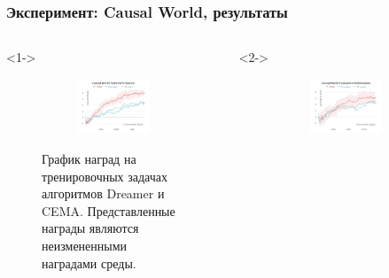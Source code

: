 \begin{frame}
\frametitle{Эксперимент: Causal World, результаты}

\begin{columns}[t]
\begin{column}{0.48\linewidth}<1->
    \begin{figure}
        \begin{subfigure}{\linewidth}
        \centering
          \includegraphics[height=0.5\paperheight]{images/performance/cema_res_cw.png}
        \end{subfigure}
      \caption{График наград на тренировочных задачах алгоритмов Dreamer и CEMA. Представленные награды являются неизмененными наградами среды.}
    \end{figure}
\end{column}
\hfill
\begin{column}{0.48\linewidth}<2->
    \begin{figure}
        \begin{subfigure}{\linewidth}
          \centering
          \includegraphics[height=0.5\paperheight]{images/performance/cema_eval_cw.png}

\end{subfigure}
\end{figure}
\end{column}
\end{columns}
\end{frame}
